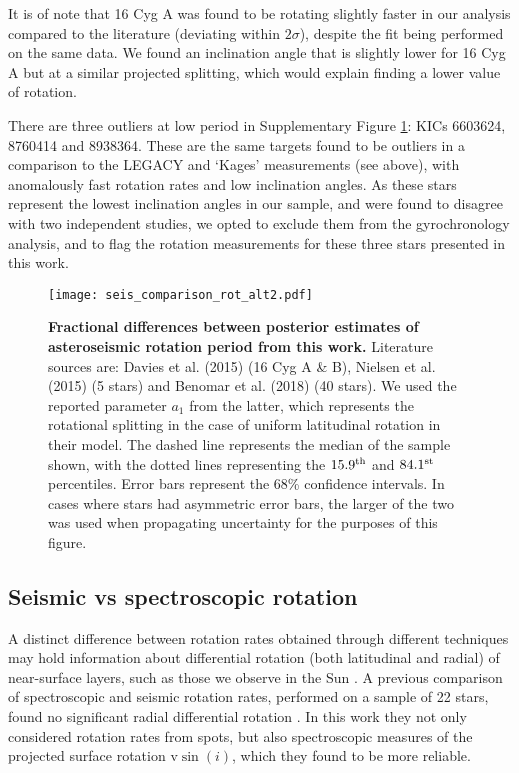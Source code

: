 It is of note that 16 Cyg A was found to be rotating slightly faster in our analysis compared to the literature \cite{davies+2015} (deviating within $2\sigma$), despite the fit being performed on the same data. We found an inclination angle that is slightly lower for 16 Cyg A but at a similar projected splitting, which would explain finding a lower value of rotation.

There are three outliers at low period in  Supplementary Figure \ref{fig:literaturecomp}: KICs 6603624, 8760414 and 8938364. These are the same targets found to be outliers in a comparison to the LEGACY and `Kages' measurements (see above), with anomalously fast rotation rates and low inclination angles. As these stars represent the lowest inclination angles in our sample, and were found to disagree with two independent studies, we opted to exclude them from the gyrochronology analysis, and to flag the rotation measurements for these three stars presented in this work.


\begin{figure}[h!]
	\centering
	\texttt{[image: seis\_comparison\_rot\_alt2.pdf]}
	\caption{\textbf{Fractional differences between posterior estimates of asteroseismic rotation period from this work.} Literature sources are: Davies et al. (2015) \cite{davies+2015} (16 Cyg A \& B), Nielsen et al. (2015) \cite{nielsen+2015} (5 stars) and Benomar et al. (2018) \cite{benomar+2018} (40 stars). We used the reported parameter $a_{1}$ from the latter, which represents the rotational splitting in the case of uniform latitudinal rotation in their model. The dashed line represents the median of the sample shown, with the dotted lines representing the $15.9^{\rm{th}}$ and $84.1^{\rm{st}}$ percentiles. Error bars represent the 68\% confidence intervals. In cases where stars had asymmetric error bars, the larger of the two was used when propagating uncertainty for the purposes of this figure.}
	\label{fig:literaturecomp}
\end{figure}

\subsection{Seismic vs spectroscopic rotation}
A distinct difference between rotation rates obtained through different techniques may hold information about differential rotation (both latitudinal and radial) of near-surface layers, such as those we observe in the Sun \cite{beck2000}.  A previous comparison of spectroscopic and seismic rotation rates, performed on a sample of 22 stars, found no significant radial differential rotation \cite{benomar+2018}. In this work they not only considered rotation rates from spots, but also spectroscopic measures of the projected surface rotation $\textrm{v}\sin(i)$, which they found to be more reliable.

